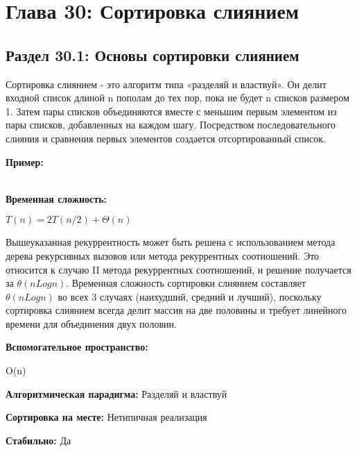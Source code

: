 \chapter*{Глава 30: Сортировка слиянием}
\section*{Раздел 30.1: Основы сортировки слиянием}
Сортировка слиянием - это алгоритм типа «разделяй и властвуй». Он делит входной список длиной n пополам до тех пор, пока не будет n списков размером 1. Затем пары списков объединяются вместе с меньшим первым элементом из пары списков, добавленных на каждом шагу. Посредством последовательного слияния и сравнения первых элементов создается отсортированный список.

\textbf{Пример:}

\vspace{\baselineskip}

\\
\textbf{Временная сложность:}
\colorbox{gray!6!white}{ \parbox{10em}{$T(n)= 2T(n/2) + \Theta(n)$}}

\vspace{\baselineskip}

Вышеуказанная рекуррентность может быть решена с использованием метода дерева рекурсивных вызовов или метода рекуррентных соотношений. Это относится к случаю II метода рекуррентных соотношений, и решение получается за $\theta(nLogn)$. Временная сложность сортировки слиянием составляет $\theta(nLogn)$ во всех 3 случаях (наихудший, средний и лучший), поскольку сортировка слиянием всегда делит массив на две половины и требует линейного времени для объединения двух половин.

\textbf{Вспомогательное пространство:} \colorbox{gray!6!white}{ \parbox{2em}{O(n)}}

\vspace{\baselineskip}

\textbf{Алгоритмическая парадигма:} Разделяй и властвуй

\vspace{\baselineskip}

\textbf{Сортировка на месте:} Нетипичная реализация

\vspace{\baselineskip}

\textbf{Стабильно:} Да

\vspace{\baselineskip}

